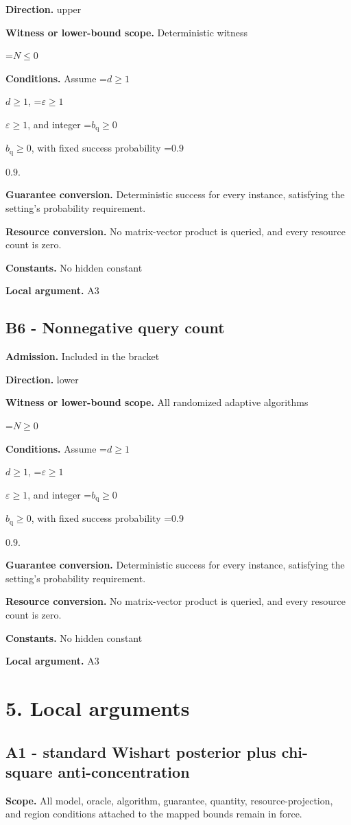 \documentclass[10pt,a4paper]{article}
\newcommand{\AtlasMath}[1]{\par\begingroup\centering\setbox0=\hbox{$\displaystyle #1$}\ifdim\wd0>1.4\linewidth\typeout{ATLAS WIDE FORMULA: \the\wd0}\fi\ifdim\wd0>\linewidth\resizebox{\linewidth}{!}{\box0}\else\box0\fi\par\endgroup}
\newcommand{\AtlasInlineMath}[1]{\begingroup\setbox0=\hbox{$#1$}\ifdim\wd0>.4\linewidth\endgroup\AtlasMath{#1}\else\endgroup$#1$\fi}
\begin{document}
\textbf{Direction.} upper

\textbf{Witness or lower-bound scope.} Deterministic witness

\AtlasMath{N\le0}
\textbf{Conditions.} Assume \AtlasInlineMath{d\ge1}, \AtlasInlineMath{\varepsilon\ge1}, and integer \AtlasInlineMath{b_{\mathrm q}\ge0}, with fixed success probability \AtlasInlineMath{0.9}.

\textbf{Guarantee conversion.} Deterministic success for every instance, satisfying the setting's probability requirement.

\textbf{Resource conversion.} No matrix-vector product is queried, and every resource count is zero.

\textbf{Constants.} No hidden constant

\textbf{Local argument.} A3

\subsection{B6 - Nonnegative query count}
\textbf{Admission.} Included in the bracket

\textbf{Direction.} lower

\textbf{Witness or lower-bound scope.} All randomized adaptive algorithms

\AtlasMath{N\ge0}
\textbf{Conditions.} Assume \AtlasInlineMath{d\ge1}, \AtlasInlineMath{\varepsilon\ge1}, and integer \AtlasInlineMath{b_{\mathrm q}\ge0}, with fixed success probability \AtlasInlineMath{0.9}.

\textbf{Guarantee conversion.} Deterministic success for every instance, satisfying the setting's probability requirement.

\textbf{Resource conversion.} No matrix-vector product is queried, and every resource count is zero.

\textbf{Constants.} No hidden constant

\textbf{Local argument.} A3

\section{5. Local arguments}
\subsection{A1 - standard Wishart posterior plus chi-square anti-concentration}
\textbf{Scope.} All model, oracle, algorithm, guarantee, quantity, resource-projection, and region conditions attached to the mapped bounds remain in force.
\end{document}
